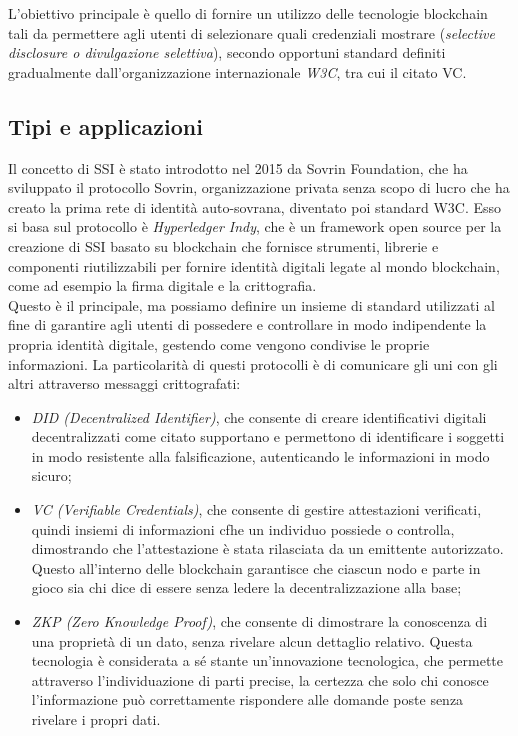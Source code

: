 L'obiettivo principale è quello di fornire un utilizzo delle tecnologie blockchain tali da permettere agli utenti 
di selezionare quali credenziali mostrare (\textit{selective disclosure o divulgazione selettiva}),
secondo opportuni standard definiti gradualmente dall'organizzazione internazionale \textit{W3C}, tra cui il citato VC.

\subsection{Tipi e applicazioni}\label{sec:self-sovereign-identity-tipi-applicazioni}

Il concetto di SSI è stato introdotto nel 2015 da Sovrin Foundation, che ha sviluppato il protocollo Sovrin,
organizzazione privata senza scopo di lucro che ha creato la prima rete di identità auto-sovrana, diventato poi standard W3C. 
Esso si basa sul protocollo è \textit{Hyperledger Indy}, che è un framework open source per la creazione di SSI basato su blockchain
che fornisce strumenti, librerie e componenti riutilizzabili per fornire identità digitali legate al mondo blockchain, 
come ad esempio la firma digitale e la crittografia. \\

Questo è il principale, ma possiamo definire un insieme di standard 
utilizzati al fine di garantire agli utenti di possedere e controllare in modo indipendente la propria identità digitale, gestendo come vengono
condivise le proprie informazioni. La particolarità di questi protocolli è di comunicare gli uni con gli altri attraverso messaggi crittografati:
\begin{itemize}
    \item \textit{DID (Decentralized Identifier)}, che consente di creare identificativi digitali decentralizzati come citato supportano
    e permettono di identificare i soggetti in modo resistente alla falsificazione, autenticando le informazioni in modo sicuro;
    \item \textit{VC (Verifiable Credentials)}, che consente di gestire attestazioni verificati, quindi insiemi di informazioni cfhe un individuo
    possiede o controlla, dimostrando che l'attestazione è stata rilasciata da un emittente autorizzato. Questo all'interno delle blockchain
    garantisce che ciascun nodo e parte in gioco sia chi dice di essere senza ledere la decentralizzazione alla base;
    \item \textit{ZKP (Zero Knowledge Proof)}, che consente di dimostrare la conoscenza di una proprietà di un dato, senza rivelare alcun dettaglio relativo.
    Questa tecnologia è considerata a sé stante un'innovazione tecnologica, che permette attraverso l'individuazione di parti precise,
    la certezza che solo chi conosce l'informazione può correttamente rispondere alle domande poste senza rivelare i propri dati.
\end{itemize}

